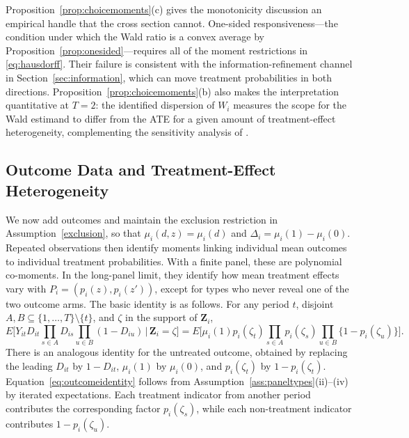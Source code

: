 \documentclass[11pt]{article}
\newcommand{\1}{\mathbf{1}}
\begin{document}
Proposition~\ref{prop:choicemoments}(c) gives the monotonicity discussion an empirical handle that the cross section cannot. One-sided responsiveness---the condition under which the Wald ratio is a convex average by Proposition~\ref{prop:onesided}---requires all of the moment restrictions in \eqref{eq:hausdorff}. Their failure is consistent with the information-refinement channel in Section~\ref{sec:information}, which can move treatment probabilities in both directions. Proposition~\ref{prop:choicemoments}(b) also makes the interpretation quantitative at $T=2$: the identified dispersion of $W_i$ measures the scope for the Wald estimand to differ from the ATE for a given amount of treatment-effect heterogeneity, complementing the sensitivity analysis of \citet{small2017}.

\subsection{Outcome Data and Treatment-Effect Heterogeneity}
\label{subsec:panel-outcomes}

We now add outcomes and maintain the exclusion restriction in
Assumption~\ref{exclusion}, so that $\mu_i(d,z)=\mu_i(d)$ and
$\Delta_i=\mu_i(1)-\mu_i(0)$. Repeated observations then identify moments
linking individual mean outcomes to individual treatment probabilities. With a
finite panel, these are polynomial co-moments. In the long-panel limit, they
identify how mean treatment effects vary with
$P_i=(p_i(z),p_i(z'))$, except for types who never reveal one of the two
outcome arms. The basic identity is as follows. For any period $t$, disjoint
$A,B\subseteq\{1,\ldots,T\}\setminus\{t\}$, and $\zeta$ in the support of
$\mathbf Z_i$,
\begin{equation}
E\Big[Y_{it}D_{it}\prod_{s\in A}D_{is}
                  \prod_{u\in B}(1-D_{iu})
  \,\Big|\,\mathbf Z_i=\zeta\Big]
=
E\Big[\mu_i(1)p_i(\zeta_t)
       \prod_{s\in A}p_i(\zeta_s)
       \prod_{u\in B}\{1-p_i(\zeta_u)\}\Big].
\label{eq:outcomeidentity}
\end{equation}
There is an analogous identity for the untreated outcome, obtained by
replacing the leading $D_{it}$ by $1-D_{it}$, $\mu_i(1)$ by $\mu_i(0)$,
and $p_i(\zeta_t)$ by $1-p_i(\zeta_t)$. Equation~\eqref{eq:outcomeidentity}
follows from Assumption~\ref{ass:paneltypes}(ii)--(iv) by iterated
expectations. Each treatment indicator from another period contributes the
corresponding factor $p_i(\zeta_s)$, while each non-treatment indicator
contributes $1-p_i(\zeta_u)$.
\end{document}
